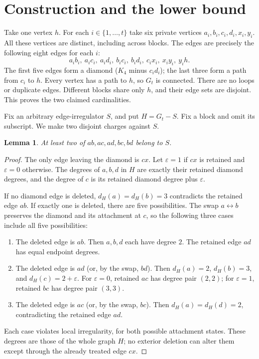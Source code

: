 \documentclass[11pt]{article}
\newtheorem{lemma}{Lemma}
\begin{document}
\newpage
\section{Construction and the lower bound}
Take one vertex $h$. For each $i\in\{1,\ldots,t\}$ take six private vertices
$a_i,b_i,c_i,d_i,x_i,y_i$. All these vertices are distinct, including across
blocks. The edges are precisely the following eight edges for each $i$:
\begin{equation}\label{edges}
 a_i b_i,\ a_i c_i,\ a_i d_i,\ b_i c_i,\ b_i d_i,
 \ c_i x_i,\ x_i y_i,\ y_i h.
\end{equation}
The first five edges form a diamond ($K_4$ minus $c_id_i$); the last three
form a path from $c_i$ to $h$. Every vertex has a path to $h$, so $G_t$ is
connected. There are no loops or duplicate edges. Different blocks share
only $h$, and their edge sets are disjoint. This proves the two claimed
cardinalities.

Fix an arbitrary edge-irregulator $S$, and put $H=G_t-S$. Fix a block and
omit its subscript. We make two disjoint charges against $S$.

\begin{lemma}\label{diamond}
At least two of $ab,ac,ad,bc,bd$ belong to $S$.
\end{lemma}
\begin{proof}
The only edge leaving the diamond is $cx$. Let $\varepsilon=1$ if $cx$
is retained and $\varepsilon=0$ otherwise. The degrees of $a,b,d$ in $H$
are exactly their retained diamond degrees, and the degree of $c$ is its
retained diamond degree plus $\varepsilon$.

If no diamond edge is deleted, $d_H(a)=d_H(b)=3$ contradicts the retained
edge $ab$. If exactly one is deleted, there are five possibilities.
The swap $a\leftrightarrow b$ preserves the diamond and its attachment at
$c$, so the following three cases include all five possibilities:
\begin{enumerate}
\item The deleted edge is $ab$. Then $a,b,d$ each have degree $2$.
The retained edge $ad$ has equal endpoint degrees.
\item The deleted edge is $ad$ (or, by the swap, $bd$).
Then $d_H(a)=2$, $d_H(b)=3$, and $d_H(c)=2+\varepsilon$.
For $\varepsilon=0$, retained $ac$ has degree pair $(2,2)$;
for $\varepsilon=1$, retained $bc$ has degree pair $(3,3)$.
\item The deleted edge is $ac$ (or, by the swap, $bc$).
Then $d_H(a)=d_H(d)=2$, contradicting the retained edge $ad$.
\end{enumerate}
Each case violates local irregularity, for both possible attachment states.
These degrees are those of the whole graph $H$; no exterior deletion can
alter them except through the already treated edge $cx$.
\end{proof}
\end{document}
